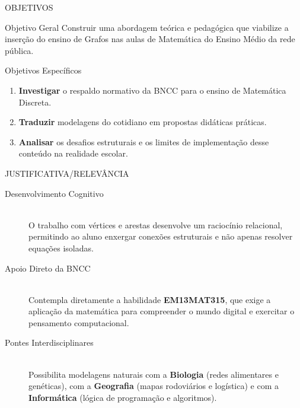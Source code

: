\documentclass[10pt, aspectratio=169]{beamer}
\begin{document}
\begin{frame}{OBJETIVOS}
  \begin{block}{Objetivo Geral}
    Construir uma abordagem teórica e pedagógica que viabilize a inserção do ensino de Grafos nas aulas de Matemática do Ensino Médio da rede pública.
  \end{block}
  
  \vspace{0.4cm}
  
  \begin{block}{Objetivos Específicos}
    \begin{enumerate}
      \item \textbf{Investigar} o respaldo normativo da BNCC para o ensino de Matemática Discreta.
      \item \textbf{Traduzir} modelagens do cotidiano em propostas didáticas práticas.
      \item \textbf{Analisar} os desafios estruturais e os limites de implementação desse conteúdo na realidade escolar.
    \end{enumerate}
  \end{block}
\end{frame}

\begin{frame}{JUSTIFICATIVA/RELEVÂNCIA}
  \vspace{0.2cm}
  \begin{description}
    \item[Desenvolvimento Cognitivo]\hfill\\ 
    O trabalho com vértices e arestas desenvolve um raciocínio relacional, permitindo ao aluno enxergar conexões estruturais e não apenas resolver equações isoladas.
    \vspace{0.3cm}
    
    \item[Apoio Direto da BNCC]\hfill\\ 
    Contempla diretamente a habilidade \textbf{EM13MAT315}, que exige a aplicação da matemática para compreender o mundo digital e exercitar o pensamento computacional.
    \vspace{0.3cm}
    
    \item[Pontes Interdisciplinares]\hfill\\
    Possibilita modelagens naturais com a \textbf{Biologia} (redes alimentares e genéticas), com a \textbf{Geografia} (mapas rodoviários e logística) e com a \textbf{Informática} (lógica de programação e algoritmos).
  \end{description}
\end{frame}
\end{document}
